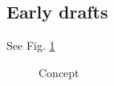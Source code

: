 \documentclass{article}
\begin{document}
\clearpage

    \subsection{Early drafts}
        See Fig. \ref{fig:concepts}
        \begin{figure}[h]
            \qquad
            \caption{Concept}
            \label{fig:concepts}
        \end{figure}

\clearpage
\end{document}
